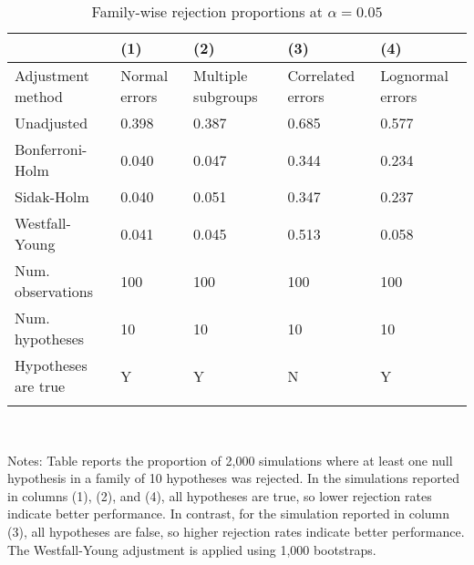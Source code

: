 \documentclass{article}
\begin{document}
\begin{table}[tbp] \centering
{}

\caption{Family-wise rejection proportions at \(\alpha = 0.05\)}
\label{tab:wyoung1}
\begin{tabularx}{\linewidth}{@{}lCCCC@{}}

\toprule
&{(1)}&{(2)}&{(3)}&{(4)} \tabularnewline \midrule
{Adjustment method}&{Normal errors}&{Multiple subgroups}&{Correlated errors}&{Lognormal errors} \tabularnewline
\midrule \addlinespace[\belowrulesep]
Unadjusted&0.398&0.387&0.685&0.577 \tabularnewline
Bonferroni-Holm&0.040&0.047&0.344&0.234 \tabularnewline
Sidak-Holm&0.040&0.051&0.347&0.237 \tabularnewline
Westfall-Young&0.041&0.045&0.513&0.058 \tabularnewline
\midrule Num. observations&100&100&100&100 \tabularnewline
Num. hypotheses&10&10&10&10 \tabularnewline
Hypotheses are true&Y&Y&N&Y \tabularnewline
\bottomrule \addlinespace[\belowrulesep]

\end{tabularx}
\\ \parbox{\linewidth}{\footnotesize Notes: Table reports the proportion of 2,000 simulations where at least one null hypothesis in a family of 10 hypotheses was rejected. In the simulations reported in columns (1), (2), and (4), all hypotheses are true, so lower rejection rates indicate better performance. In contrast, for the simulation reported in column (3), all hypotheses are false, so higher rejection rates indicate better performance. The Westfall-Young adjustment is applied using 1,000 bootstraps.}
\end{table}
\end{document}
